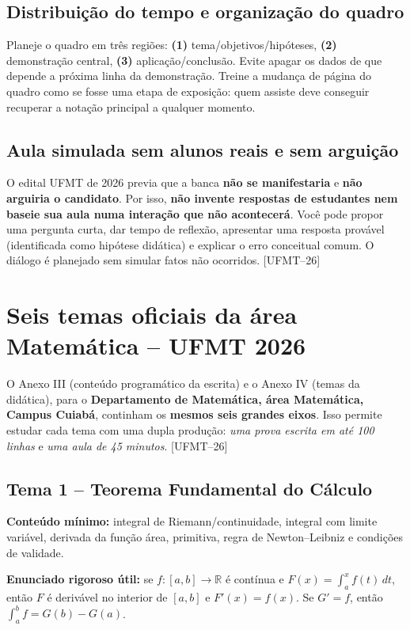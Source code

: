 \documentclass[11pt,a4paper]{article}
\newcommand{\fufmt}{\textsf{[UFMT--26]}}
\begin{document}
\subsection{Distribuição do tempo e organização do quadro}
Planeje o quadro em três regiões: \textbf{(1)} tema/objetivos/hipóteses, \textbf{(2)} demonstração central, \textbf{(3)} aplicação/conclusão. Evite apagar os dados de que depende a próxima linha da demonstração. Treine a mudança de página do quadro como se fosse uma etapa de exposição: quem assiste deve conseguir recuperar a notação principal a qualquer momento.

\subsection{Aula simulada sem alunos reais e sem arguição}
O edital UFMT de 2026 previa que a banca \textbf{não se manifestaria} e \textbf{não arguiria o candidato}. Por isso, \textbf{não invente respostas de estudantes nem baseie sua aula numa interação que não acontecerá}. Você pode propor uma pergunta curta, dar tempo de reflexão, apresentar uma resposta provável (identificada como hipótese didática) e explicar o erro conceitual comum. O diálogo é planejado sem simular fatos não ocorridos. \fufmt

\section{Seis temas oficiais da área Matemática -- UFMT 2026}
O Anexo III (conteúdo programático da escrita) e o Anexo IV (temas da didática), para o \textbf{Departamento de Matemática, área Matemática, Campus Cuiabá}, continham os \textbf{mesmos seis grandes eixos}. Isso permite estudar cada tema com uma dupla produção: \emph{uma prova escrita em até 100 linhas} e \emph{uma aula de 45 minutos}. \fufmt

\subsection{Tema 1 -- Teorema Fundamental do Cálculo}
\textbf{Conteúdo mínimo:} integral de Riemann/continuidade, integral com limite variável, derivada da função área, primitiva, regra de Newton--Leibniz e condições de validade.

\textbf{Enunciado rigoroso útil:} se $f:[a,b]\to\mathbb{R}$ é contínua e $F(x)=\int_a^x f(t)\,dt$, então $F$ é derivável no interior de $[a,b]$ e $F'(x)=f(x)$. Se $G'=f$, então $\int_a^b f=G(b)-G(a)$.
\end{document}
